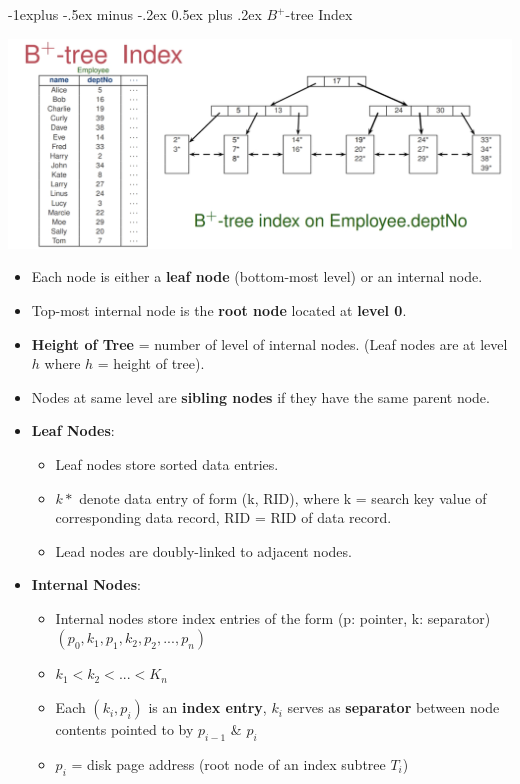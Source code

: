 \documentclass[10pt, landscape]{article}
\makeatletter
\renewcommand{\subsection}{\@startsection{subsection}{2}{0mm}%
                                {-1explus -.5ex minus -.2ex}%
                                {0.5ex plus .2ex}%
                                {\normalfont\normalsize\bfseries}}
\makeatother
\begin{document}
\begin{multicols*}{3}
\subsection{$B^+$-tree Index}
\centerline{\includegraphics[width = 1\linewidth]{B+TreeIndex}}
\begin{itemize}
\item Each node is either a \textbf{leaf node} (bottom-most level) or an internal node. 
\item Top-most internal node is the \textbf{root node} located at \textbf{level 0}.
\item \textbf{Height of Tree} = number of level of internal nodes. (Leaf nodes are at level $h$ where $h$ = height of tree).
\item Nodes at same level are \textbf{sibling nodes} if they have the same parent node.
\item \textbf{Leaf Nodes}:
	\begin{itemize}
	\item Leaf nodes store sorted data entries.
	\item $k*$ denote data entry of form (k, RID), where k = search key value of corresponding data record, RID = RID of data record.
	\item Lead nodes are doubly-linked to adjacent nodes.
	\end{itemize}
\item \textbf{Internal Nodes}:
	\begin{itemize}
	\item Internal nodes store index entries of the form (p: pointer, k: separator)\\
	 $(p_0, k_1, p_1, k_2, p_2, ..., p_n)$
	\item $k_1 < k_2 < ... < K_n$
	\item Each $(k_i, p_i)$ is an \textbf{index entry}, $k_i$ serves as \textbf{separator} between node contents pointed to by $p_{i-1}$ \& $p_i$
	\item $p_i$ = disk page address (root node of an index subtree $T_i$)
	\end{itemize}
\end{itemize}


\end{multicols*}
\end{document}
